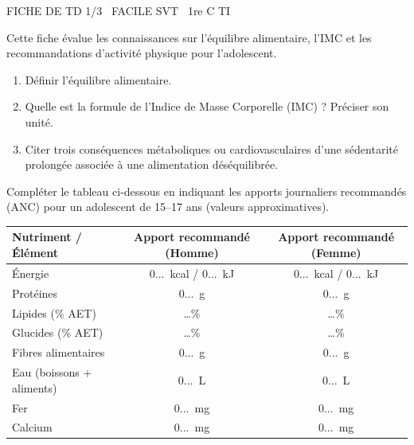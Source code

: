 \documentclass[11pt]{article}
\begin{document}
\begin{tcolorbox}[enhanced,colback=popink,colframe=popink,arc=10pt,boxrule=0pt,left=12pt,right=12pt,top=9pt,bottom=9pt]
{\color{white}\popxbold\small FICHE DE TD 1/3 \textbullet\ FACILE \hfill SVT \textbullet\ 1re C TI\par}
\end{tcolorbox}
\vspace{4pt}
Cette fiche évalue les connaissances sur l'équilibre alimentaire, l'IMC et les recommandations d'activité physique pour l'adolescent.

\begin{exercice}
\begin{enumerate}
    \item Définir l'équilibre alimentaire.
    \item Quelle est la formule de l'Indice de Masse Corporelle (IMC) ? Préciser son unité.
    \item Citer trois conséquences métaboliques ou cardiovasculaires d'une sédentarité prolongée associée à une alimentation déséquilibrée.
\end{enumerate}
\end{exercice}

\begin{exercice}
Compléter le tableau ci-dessous en indiquant les apports journaliers recommandés (ANC) pour un adolescent de 15--17 ans (valeurs approximatives).
\begin{tabular}{|l|c|c|}
\hline
\textbf{Nutriment / Élément} & \textbf{Apport recommandé (Homme)} & \textbf{Apport recommandé (Femme)} \\
\hline
Énergie & \SI{...}{kcal} / \SI{...}{kJ} & \SI{...}{kcal} / \SI{...}{kJ} \\
\hline
Protéines & \SI{...}{g} & \SI{...}{g} \\
\hline
Lipides (\% AET) & \ldots\% & \ldots\% \\
\hline
Glucides (\% AET) & \ldots\% & \ldots\% \\
\hline
Fibres alimentaires & \SI{...}{g} & \SI{...}{g} \\
\hline
Eau (boissons + aliments) & \SI{...}{L} & \SI{...}{L} \\
\hline
Fer & \SI{...}{mg} & \SI{...}{mg} \\
\hline
Calcium & \SI{...}{mg} & \SI{...}{mg} \\
\hline
\end{tabular}
\end{exercice}
\end{document}
